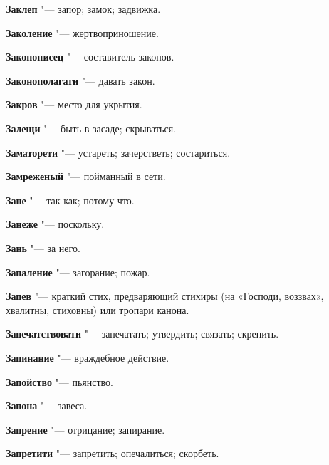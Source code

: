 \begin{mymulticols}{2}
\noindent\textbf{Заклеп} "--- запор; замок; задвижка. 




\noindent\textbf{Заколение} "--- жертвоприношение. 




\noindent\textbf{Законописец} "--- составитель законов. 




\noindent\textbf{Законополагати} "--- давать закон. 




\noindent\textbf{Закров} "--- место для укрытия. 




\noindent\textbf{Залещи} "--- быть в засаде; скрываться. 




\noindent\textbf{Заматорети} "--- устареть; зачерстветь; состариться. 




\noindent\textbf{Замреженый} "--- пойманный в сети. 




\noindent\textbf{Зане} "--- так как; потому что. 




\noindent\textbf{Занеже} "--- поскольку. 




\noindent\textbf{Зань} "--- за него. 




\noindent\textbf{Запаление} "--- загорание; пожар. 




\noindent\textbf{Запев} "--- краткий стих, предваряющий стихиры (на «Господи, воззвах», хвалитны, стиховны) или тропари канона. 




\noindent\textbf{Запечатствовати} "--- запечатать; утвердить; связать; скрепить. 




\noindent\textbf{Запинание} "--- враждебное действие. 




\noindent\textbf{Запойство} "--- пьянство. 




\noindent\textbf{Запона} "--- завеса. 




\noindent\textbf{Запрение} "--- отрицание; запирание. 




\noindent\textbf{Запретити} "--- запретить; опечалиться; скорбеть. 





\end{mymulticols}
